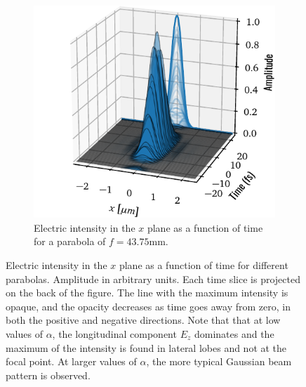 \documentclass[11pt,SymmetricalJury]{inrsthesis/inrsthesis}
\begin{document}
\begin{figure}
\begin{subfigure}{0.47\textwidth}
      \includegraphics[width=\textwidth]{figs/ElectricIntensityTimeWaterfallf0.04375.pdf}
      \caption{Electric intensity in the $x$ plane as a function of time for a parabola of $f=43.75\si{\milli\metre}$.}
      \label{fig:sc.electric_intensity_waterfall43}
    \end{subfigure}
    \caption[Transverse cut of the electric intensity in the focal plane as a function of time, $x$ plane.]
            {Electric intensity in the $x$ plane as a function of time for different parabolas.
            Amplitude in arbitrary units. Each time slice is projected on the back of the figure.
            The line with the maximum intensity is opaque, and the opacity decreases as time
            goes away from zero, in both the positive and negative directions. Note that that at
            low values of $\alpha$, the longitudinal component $E_z$ dominates and the maximum
            of the intensity is found in lateral lobes and not at the focal point. At
            larger values of $\alpha$, the more typical Gaussian beam pattern is observed.}
    \label{fig:sc.electric_intensity_waterfall}
  \end{figure}



\end{document}
